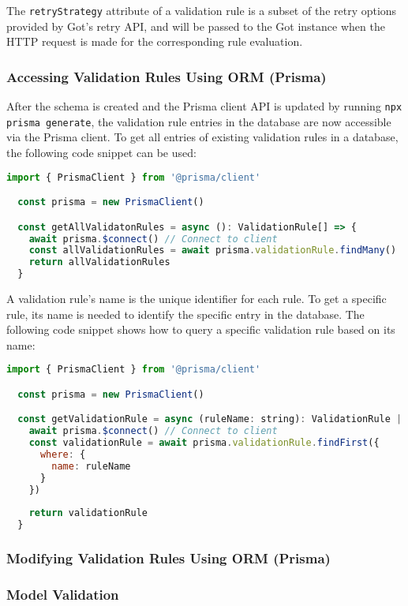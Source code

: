   The \verb;retryStrategy; attribute of a validation rule is a subset of the retry options provided by Got's retry API, and will be passed to the Got instance when the HTTP request is made for the corresponding rule evaluation. 

 \subsubsection{Accessing Validation Rules Using ORM (Prisma)} 
  After the schema is created and the Prisma client API is updated by running \verb;npx prisma generate;, the validation rule entries in the database are now accessible via the Prisma client. To get all entries of existing validation rules in a database, the following code snippet can be used:

  \begin{lstlisting}[caption={Getting all existing validation rules in the database (TypeScript)}, language=js]
  import { PrismaClient } from '@prisma/client'

  const prisma = new PrismaClient()

  const getAllValidatonRules = async (): ValidationRule[] => {
    await prisma.$connect() // Connect to client
    const allValidationRules = await prisma.validationRule.findMany()
    return allValidationRules
  }
  \end{lstlisting}
  
  A validation rule's name is the unique identifier for each rule. To get a specific rule, its name is needed to identify the specific entry in the database. The following code snippet shows how to query a specific validation rule based on its name:

  \begin{lstlisting}[caption={Getting an existing validation rule based on its name in the database (TypeScript)}, language=js]
  import { PrismaClient } from '@prisma/client'

  const prisma = new PrismaClient()

  const getValidationRule = async (ruleName: string): ValidationRule | null => {
    await prisma.$connect() // Connect to client
    const validationRule = await prisma.validationRule.findFirst({
      where: {
        name: ruleName
      }
    })
    
    return validationRule
  }
  \end{lstlisting}  


 \subsubsection{Modifying Validation Rules Using ORM (Prisma)}

 \subsubsection{Model Validation}